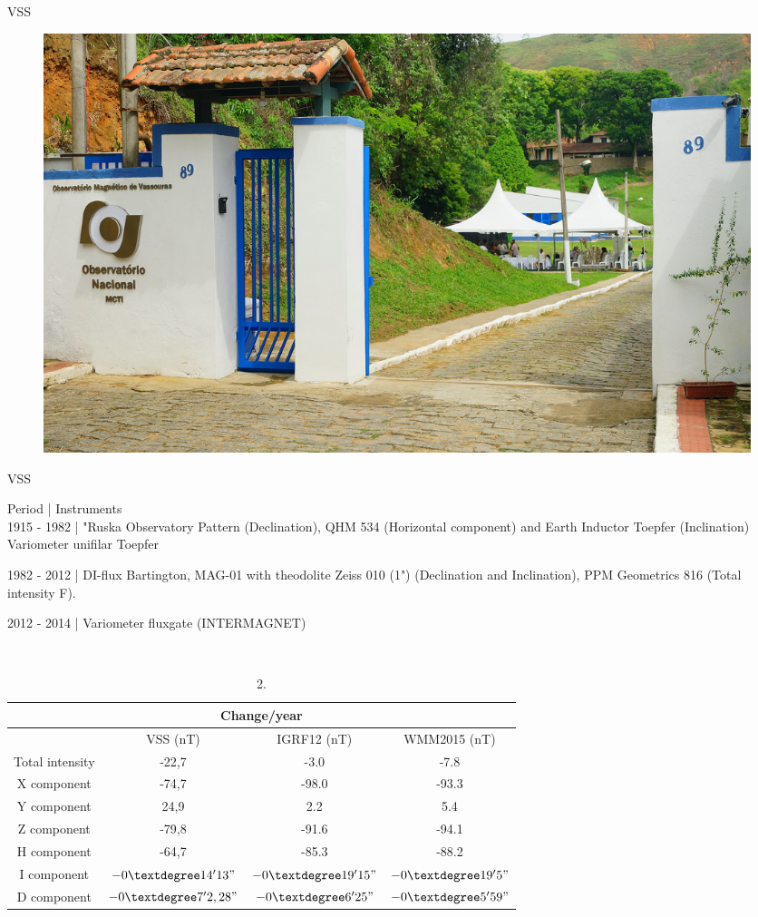 \documentclass[final,t]{beamer}
\begin{document}
\begin{columns}[t]
\begin{column}{.33\linewidth}
\begin{block}{VSS}
	\justifying
\begin{figure}
\centering
\includegraphics[width=0.8\linewidth]{OMV_JOELSONMOREIRA}
\caption{}
\label{fig:OMV_JOELSONMOREIRA}
\end{figure}





\end{block}


\begin{block}{VSS}
\centering

	 Period |\hspace{2.0cm}  Instruments   \\ 
	 
	 1915 - 1982 | "Ruska Observatory Pattern (Declination), QHM 534 (Horizontal component) and Earth Inductor Toepfer (Inclination) Variometer unifilar Toepfer 
	 
	 1982 - 2012 | DI-flux Bartington, MAG-01 with theodolite Zeiss 010 (1") (Declination and Inclination), PPM Geometrics 816 (Total intensity F).
	 
	 2012 - 2014 | Variometer fluxgate (INTERMAGNET)


\\

\begin{table}
\begin{tabular}{|c|c|c|c|}
		\hline
		\multicolumn{4}{|c|}{\textbf{Change/year}}\\	
	\hline   & VSS (nT)& IGRF12 (nT) & WMM2015 (nT)\\ 
	\hline Total intensity & -22,7  & -3.0  & -7.8  \\ 
	\hline X component & -74,7 & -98.0 & -93.3 \\ 
	\hline Y component & 24,9  & 2.2 & 5.4 \\ 
	\hline Z component & -79,8 & -91.6  & -94.1\\ 
	\hline H component  & -64,7 & -85.3 & -88.2\\ 
	\hline I component  & $-0° 14' 13"$ & $-0° 19' 15"$ &$-0° 19' 5"$\\ 
	\hline D component  & $-0° 7' 2,28"$ & $-0° 6' 25"$ &$ -0° 5' 59"$\\ 
	\hline 
\end{tabular} 
\caption{2. }
\end{table}		
\end{block}



\end{column}
\end{columns}
\end{document}
